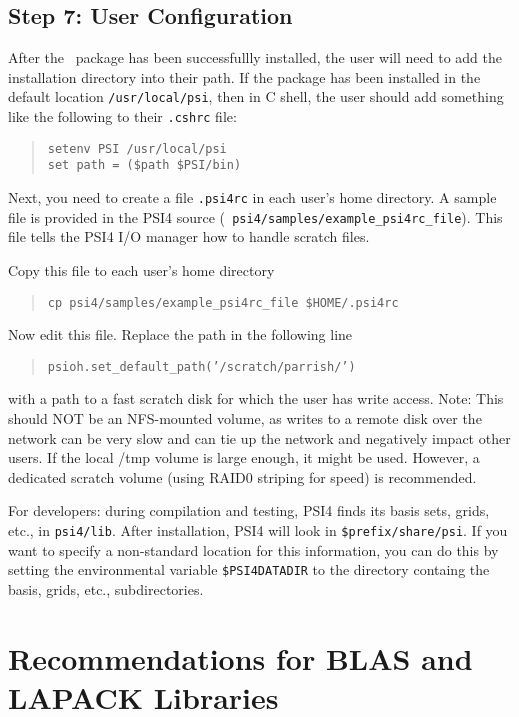 \documentclass[12pt]{article}
\begin{document}
\subsection{Step 7: User Configuration}

After the \PSIfour\ package has been successfullly installed, the user will
need to add the installation directory into their path.  If the package
has been installed in the default location {\tt /usr/local/psi}, then
in C shell, the user should add something like the following to 
their {\tt .cshrc} file:
\begin{quotation}
\noindent
{\tt setenv PSI /usr/local/psi} \\
{\tt set path = (\$path \$PSI/bin)}
\end{quotation}

Next, you need to create a file {\tt .psi4rc} in each user's home
directory.  A sample file is provided in the PSI4 source ({\tt
psi4/samples/example\_psi4rc\_file}).  This file tells the PSI4 I/O
manager how to handle scratch files.

Copy this file to each user's home directory

\begin{quotation}
{\tt cp psi4/samples/example\_psi4rc\_file \$HOME/.psi4rc}
\end{quotation}

Now edit this file.  Replace the path in the following line

\begin{quotation}
{\tt psioh.set\_default\_path('/scratch/parrish/')}
\end{quotation}
with a path to a fast scratch disk for which the user has write access.  Note:
This should NOT be an NFS-mounted volume, as writes to a remote disk over the
network can be very slow and can tie up the network and negatively impact
other users.  If the local /tmp volume is large enough, it might be used.
However, a dedicated scratch volume (using RAID0 striping for speed) is
recommended.

For developers: during compilation and testing, PSI4 finds its
basis sets, grids, etc., in {\tt psi4/lib}.  After installation,
PSI4 will look in {\tt \$prefix/share/psi}.  If you want to specify a
non-standard location for this information, you can do this by setting
the environmental variable {\tt \$PSI4DATADIR} to the directory containg
the basis, grids, etc., subdirectories.


\section{Recommendations for BLAS and LAPACK Libraries}
\end{document}
